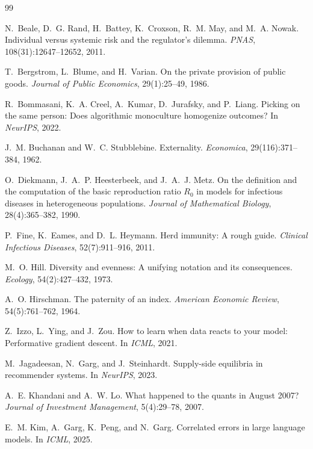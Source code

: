 \documentclass{article}
\theoremstyle{plain}
\theoremstyle{definition}
\begin{document}
\begin{thebibliography}{99}
\small

 N.~Beale, D.~G. Rand, H.~Battey, K.~Croxson, R.~M. May, and M.~A. Nowak. Individual versus systemic risk and the regulator's dilemma. \emph{PNAS}, 108(31):12647--12652, 2011.

 T.~Bergstrom, L.~Blume, and H.~Varian. On the private provision of public goods. \emph{Journal of Public Economics}, 29(1):25--49, 1986.

 R.~Bommasani, K.~A. Creel, A.~Kumar, D.~Jurafsky, and P.~Liang. Picking on the same person: Does algorithmic monoculture homogenize outcomes? In \emph{NeurIPS}, 2022.

 J.~M. Buchanan and W.~C. Stubblebine. Externality. \emph{Economica}, 29(116):371--384, 1962.

 O.~Diekmann, J.~A.~P. Heesterbeek, and J.~A.~J. Metz. On the definition and the computation of the basic reproduction ratio $R_0$ in models for infectious diseases in heterogeneous populations. \emph{Journal of Mathematical Biology}, 28(4):365--382, 1990.

 P.~Fine, K.~Eames, and D.~L. Heymann. Herd immunity: A rough guide. \emph{Clinical Infectious Diseases}, 52(7):911--916, 2011.

 M.~O. Hill. Diversity and evenness: A unifying notation and its consequences. \emph{Ecology}, 54(2):427--432, 1973.

 A.~O. Hirschman. The paternity of an index. \emph{American Economic Review}, 54(5):761--762, 1964.

 Z.~Izzo, L.~Ying, and J.~Zou. How to learn when data reacts to your model: Performative gradient descent. In \emph{ICML}, 2021.

 M.~Jagadeesan, N.~Garg, and J.~Steinhardt. Supply-side equilibria in recommender systems. In \emph{NeurIPS}, 2023.

 A.~E. Khandani and A.~W. Lo. What happened to the quants in August 2007? \emph{Journal of Investment Management}, 5(4):29--78, 2007.

 E.~M. Kim, A.~Garg, K.~Peng, and N.~Garg. Correlated errors in large language models. In \emph{ICML}, 2025.


\end{thebibliography}
\end{document}
